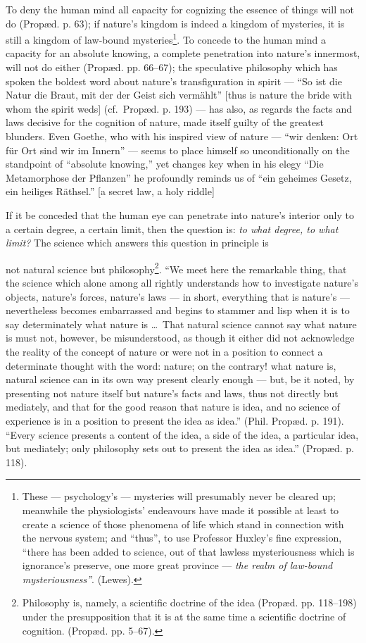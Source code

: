 \documentclass[12pt,a4paper]{book}
\begin{document}
To deny the human mind all capacity for cognizing the essence of things will not
do (Propæd. p. 63); if nature's kingdom is indeed a kingdom of mysteries, it is
still a kingdom of law-bound mysteries\footnote{These --- psychology's ---
mysteries will presumably never be cleared up; meanwhile the physiologists'
endeavours have made it possible at least to create a science of those phenomena
of life which stand in connection with the nervous system; and ``thus'', to use
Professor Huxley's fine expression, ``there has been added to science, out of that
lawless mysteriousness which is ignorance's preserve, one more great province ---
\emph{the realm of law-bound mysteriousness''}. (Lewes).}. To concede to the human
mind a capacity for an absolute knowing, a complete penetration into nature's
innermost, will not do either (Propæd. pp. 66--67); the speculative philosophy
which has spoken the boldest word about nature's transfiguration in spirit ---
``So ist die Natur die Braut, mit der der Geist sich vermählt'' [thus is nature the
bride with whom the spirit weds] (cf.\ Propæd. p. 193) --- has also, as regards the
facts and laws decisive for the cognition of nature, made itself guilty of the
greatest blunders. Even Goethe, who with his inspired view of nature --- ``wir
denken: Ort für Ort sind wir im Innern'' --- seems to place himself so
unconditionally on the standpoint of ``absolute knowing,'' yet changes key when in
his elegy ``Die Metamorphose der Pflanzen'' he profoundly reminds us of ``ein
geheimes Gesetz, ein heiliges Räthsel.'' [a secret law, a holy riddle]

If it be conceded that the human eye can penetrate into nature's interior only to
a certain degree, a certain limit, then the question is: \emph{to what degree, to
what limit?} The science which answers this question in principle is

\setcounter{footnote}{0}
not natural science but philosophy\footnote{Philosophy is, namely, a scientific
doctrine of the idea (Propæd. pp. 118--198) under the presupposition that it is at
the same time a scientific doctrine of cognition. (Propæd. pp. 5--67).}. ``We meet
here the remarkable thing, that the science which alone among all rightly
understands how to investigate nature's objects, nature's forces, nature's laws
--- in short, everything that is nature's --- nevertheless becomes embarrassed and
begins to stammer and lisp when it is to say determinately what nature is \dots\
That natural science cannot say what nature is must not, however, be
misunderstood, as though it either did not acknowledge the reality of the concept
of nature or were not in a position to connect a determinate thought with the
word: nature; on the contrary! what nature is, natural science can in its own way
present clearly enough --- but, be it noted, by presenting not nature itself but
nature's facts and laws, thus not directly but mediately, and that for the good
reason that nature is idea, and no science of experience is in a position to
present the idea as idea.'' (Phil. Propæd. p. 191). ``Every science presents a
content of the idea, a side of the idea, a particular idea, but mediately; only
philosophy sets out to present the idea as idea.'' (Propæd. p. 118).
\end{document}
